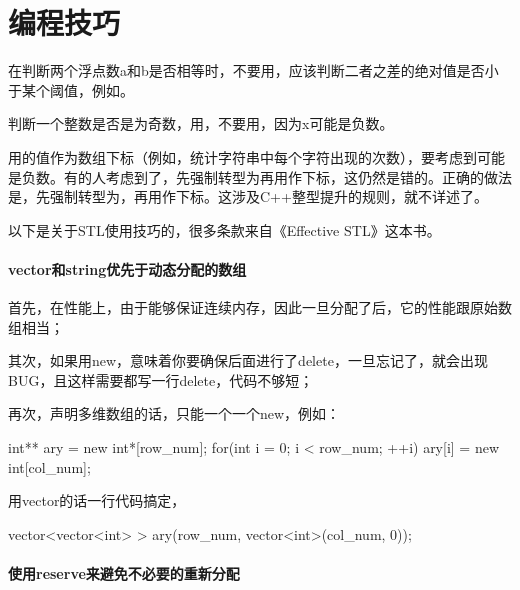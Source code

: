 \chapter{编程技巧}

在判断两个浮点数a和b是否相等时，不要用，应该判断二者之差的绝对值是否小于某个阈值，例如。

判断一个整数是否是为奇数，用，不要用，因为x可能是负数。

用的值作为数组下标（例如，统计字符串中每个字符出现的次数），要考虑到可能是负数。有的人考虑到了，先强制转型为再用作下标，这仍然是错的。正确的做法是，先强制转型为，再用作下标。这涉及C++整型提升的规则，就不详述了。

以下是关于STL使用技巧的，很多条款来自《Effective STL》这本书。

\subsubsection{vector和string优先于动态分配的数组}

首先，在性能上，由于能够保证连续内存，因此一旦分配了后，它的性能跟原始数组相当；

其次，如果用new，意味着你要确保后面进行了delete，一旦忘记了，就会出现BUG，且这样需要都写一行delete，代码不够短；

再次，声明多维数组的话，只能一个一个new，例如：
\begin{Code}
int** ary = new int*[row_num];
for(int i = 0; i < row_num; ++i)
    ary[i] = new int[col_num];
\end{Code}
用vector的话一行代码搞定，
\begin{Code}
vector<vector<int> > ary(row_num, vector<int>(col_num, 0));
\end{Code}

\subsubsection{使用reserve来避免不必要的重新分配}
